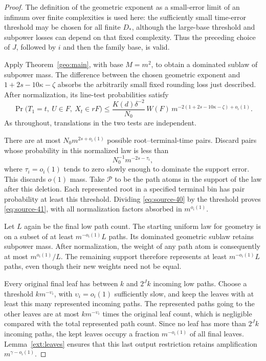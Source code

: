 \begin{proof}
The definition of the geometric exponent as a small-error limit
of an infimum over finite complexities is used here: the
sufficiently small time-error threshold may be chosen for all
finite \(D_*\), although the large-base threshold and subpower
losses can depend on that fixed complexity. Thus the preceding
choice of \(J\), followed by \(i\) and then the family base,
is valid.

Apply Theorem~\ref{geo:main}, with base \(M=m^2\), to obtain a
dominated sublaw of subpower mass. The difference between the
chosen geometric exponent and \(1+2s-10\kappa-\zeta\) absorbs
the arbitrarily small fixed rounding loss just described.
After normalization, its
line-test probabilities satisfy
\begin{equation}\label{eq:source-40}
 \Pr\bigl(T_1=t,\ U\in F,\ X_t\in rF\bigr)
 \leq
 \frac{K(d)\delta^{-2}}{N_0}\,W(F)\,
 m^{-2(1+2s-10\kappa-\zeta)+o_i(1)} .
\end{equation}
As throughout, translations in the two tests are independent.

There are at most \(N_0m^{2s+o_i(1)}\) possible root--terminal-time
pairs. Discard pairs whose probability in this normalized law is
less than
\[
                           N_0^{-1}m^{-2s-\tau_i},
\]
where \(\tau_i=o_i(1)\) tends to zero slowly enough to dominate
the support error. This discards \(o(1)\) mass. Take \(\mathcal P\)
to be the path atoms in the support of the law after this deletion.
Each represented root in a specified terminal bin has pair probability
at least this threshold. Dividing \eqref{eq:source-40} by the threshold proves
\eqref{eq:source-41}, with all normalization factors absorbed
in \(m^{o_i(1)}\).

Let \(L\) again be the final low path count. The starting uniform
law for geometry is on a subset of at least
\(m^{-o_i(1)}L\) paths. Its dominated geometric sublaw retains
subpower mass. After normalization, the weight of any path
atom is consequently at most \(m^{o_i(1)}/L\).
The remaining support therefore represents at least
\(m^{-o_i(1)}L\) paths, even though their new weights need not
be equal.

Every original final leaf has between \(k\) and \(2^Jk\)
incoming low paths. Choose a threshold \(k m^{-\upsilon_i}\),
with \(\upsilon_i=o_i(1)\) sufficiently slow, and keep the
leaves with at least this many represented incoming paths.
The represented paths going to the other leaves are at most
\(k m^{-\upsilon_i}\) times the original leaf count, which is
negligible compared with the total represented path count.
Since no leaf has more than \(2^Jk\) incoming paths, the kept
leaves occupy a fraction \(m^{-o_i(1)}\) of all final leaves.
Lemma~\ref{ext:leaves} ensures that this last output restriction
retains amplification \(m^{\gamma-o_i(1)}\).
\end{proof}

